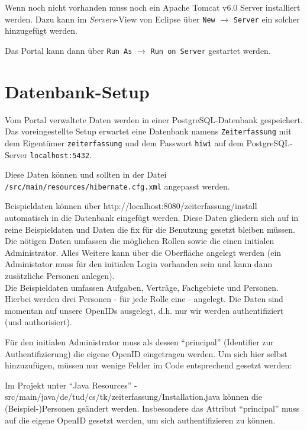 \documentclass[article,colorback,accentcolor=tud2c]{tudreport}
\begin{document}
Wenn noch nicht vorhanden muss noch ein Apache Tomcat v6.0 Server installiert werden. Dazu kann im \emph{Servers}-View von Eclipse über \texttt{New} $\rightarrow$ \texttt{Server} ein solcher hinzugefügt werden.

Das Portal kann dann über \texttt{Run As} $\rightarrow$ \texttt{Run on Server} gestartet werden.


\section{Datenbank-Setup} %
\label{sec:datenbank_setup}

Vom Portal verwaltete Daten werden in einer PostgreSQL-Datenbank gespeichert. Das voreingestellte Setup erwartet eine Datenbank namens \texttt{Zeiterfassung} mit dem Eigentümer \texttt{zeiterfassung} und dem Passwort \texttt{hiwi} auf dem PostgreSQL-Server \texttt{localhost:5432}.

Diese Daten können und sollten in der Datei \texttt{/src/main/resources/hibernate.cfg.xml} angepasst werden.

Beispieldaten können über http://localhost:8080/zeiterfassung/install automatisch in die Datenbank eingefügt werden. Diese Daten gliedern sich auf in reine Beispieldaten und Daten die fix für die Benutzung gesetzt bleiben müssen. \\
Die nötigen Daten umfassen die möglichen Rollen sowie die einen initialen Administrator. Alles Weitere kann über die Oberfläche angelegt werden (ein Administator muss für den initialen Login vorhanden sein und kann dann zusätzliche Personen anlegen). \\
Die Beispieldaten umfassen Aufgaben, Verträge, Fachgebiete und Personen. Hierbei werden drei Personen - für jede Rolle eine - angelegt. Die Daten sind momentan auf unsere OpenIDs ausgelegt, d.h. nur wir werden authentifiziert (und authorisiert). 

Für den initialen Administrator muss als dessen ``principal'' (Identifier zur Authentifizierung) die eigene OpenID eingetragen werden. Um sich hier selbst hinzuzufügen, müssen nur wenige Felder im Code entsprechend gesetzt werden:

Im Projekt unter ``Java Resources'' - src/main/java/de/tud/cs/tk/zeiterfassung/Installation.java können die (Beispiel-)Personen geändert werden. Insbesondere das Attribut ``principal'' muss auf die eigene OpenID gesetzt werden, um sich authentifizieren zu können.
\end{document}
